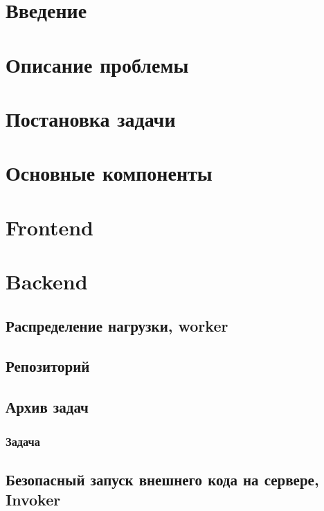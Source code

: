 \chapter{Введение}

\chapter{Описание проблемы}

\chapter{Постановка задачи}

\chapter{Основные компоненты}

\chapter{Frontend}

\chapter{Backend}

\section{Распределение нагрузки, worker}

\section{Репозиторий}

\section{Архив задач}

\subsection{Задача}

\section{Безопасный запуск внешнего кода на сервере, Invoker}
